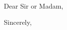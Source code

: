 \documentclass[11pt,a4paper,sans]{moderncv} %
\begin{document}
    \date{June 18, 2025}
    \opening{Dear Sir or Madam,}
    \closing{Sincerely,}

    

    \makeletterclosing
\end{document}
